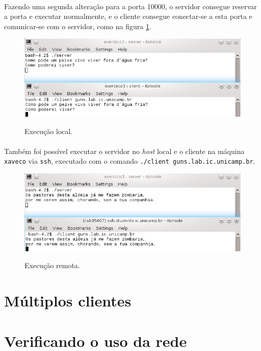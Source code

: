 \documentclass[a4paper,10pt,oneside,final,titlepage,onecolumn]{article}
\begin{document}
\paragraph{}Fazendo uma segunda alteração para a porta 10000, o servidor consegue reservar a porta e executar normalmente, e o cliente consegue conectar-se a esta porta e comunicar-se com o servidor, como na figura \ref{exec-local}.
\begin{figure}[!ht]
  \caption{Execução local.}
  \centering
  \includegraphics[width=117mm]{exec-local.png}
  \label{exec-local}
\end{figure}
\paragraph{}Também foi possível executar o servidor no \emph{host} local e o cliente na máquina \verb|xaveco| via \verb|ssh|, executado com o comando \verb|./client guns.lab.ic.unicamp.br|.
\begin{figure}[!ht]
  \caption{Execução remota.}
  \centering
  \includegraphics[width=117mm]{exec-remota.png}
  \label{exec-remota}
\end{figure}



\section{Múltiplos clientes}



\section{Verificando o uso da rede}
\end{document}
